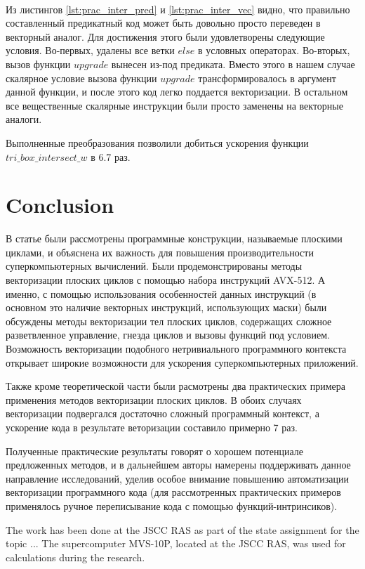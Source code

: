 \documentclass[
11pt,%
tightenlines,%
twoside,%
onecolumn,%
nofloats,%
nobibnotes,%
nofootinbib,%
superscriptaddress,%
noshowpacs,%
centertags]%
{revtex4}
\begin{document}
\ \\

Из листингов \ref{lst:prac_inter_pred} и \ref{lst:prac_inter_vec} видно, что правильно составленный предикатный код может быть довольно просто переведен в векторный аналог.
Для достижения этого были удовлетворены следующие условия.
Во-первых, удалены все ветки $else$ в условных операторах.
Во-вторых, вызов функции $upgrade$ вынесен из-под предиката.
Вместо этого в нашем случае скалярное условие вызова функции $upgrade$ трансформировалось в аргумент данной функции, и после этого код легко поддается векторизации.
В остальном все вещественные скалярные инструкции были просто заменены на векторные аналоги.

Выполненные преобразования позволили добиться ускорения функции \\
$tri\_box\_intersect\_w$ в 6.7 раз.

\section{Conclusion}

В статье были рассмотрены программные конструкции, называемые плоскими циклами, и объяснена их важность для повышения производительности суперкомпьютерных вычислений.
Были продемонстрированы методы векторизации плоских циклов с помощью набора инструкций AVX-512.
А именно, с помощью использования особенностей данных инструкций (в основном это наличие векторных инструкций, использующих маски) были обсуждены методы векторизации тел плоских циклов, содержащих сложное разветвленное управление, гнезда циклов и вызовы функций под условием.
Возможность векторизации подобного нетривиального программного контекста открывает широкие возможности для ускорения суперкомпьютерных приложений.

Также кроме теоретической части были расмотрены два практических примера применения методов векторизации плоских циклов.
В обоих случаях векторизации подвергался достаточно сложный программный контекст, а ускорение кода в результате веторизации составило примерно 7 раз.

Полученные практические результаты говорят о хорошем потенциале предложенных методов, и в дальнейшем авторы намерены поддерживать данное направление исследований, уделив особое внимание повышению автоматизации векторизации программного кода (для рассмотренных практических примеров применялось ручное переписывание кода с помощью функций-интринсиков).

\begin{acknowledgments}
The work has been done at the JSCC RAS as part of the state assignment for the topic ... The supercomputer MVS-10P, located at the JSCC RAS, was used for calculations during the research.
\end{acknowledgments}
\end{document}
